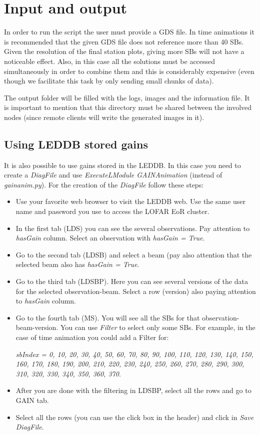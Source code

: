 \documentclass[a4paper,11pt]{article}
\begin{document}
\section {Input and output}

In order to run the script the user must provide a GDS file. In time animations it is recommended that the given GDS file does not reference more than 40 SBs. Given the resolution of the final station plots, giving more SBs will not have a noticeable effect. Also, in this case all the solutions must be accessed simultaneously in order to combine them and this is considerably expensive (even though we facilitate this task by only sending small chunks of data).

The output folder will be filled with the logs, images and the information file. It is important to mention that this directory must be shared between the involved nodes (since remote clients will write the generated images in it).

\subsection {Using LEDDB stored gains}

It is also possible to use gains stored in the LEDDB. In this case you need to create a \textit{DiagFile} and use \textit{ExecuteLModule GAINAnimation} (instead of \textit{gainanim.py}). For the creation of the \textit{DiagFile} follow these steps:

\begin{itemize}
\item Use your favorite web browser to visit the LEDDB web. Use the same user name and password you use to access the LOFAR EoR cluster.
\item In the first tab (LDS) you can see the several observations. Pay attention to \textit{hasGain} column. Select an observation with \textit{hasGain = True}.
\item Go to the second tab (LDSB) and select a beam (pay also attention that the selected beam also has \textit{hasGain = True}.
\item Go to the third tab (LDSBP). Here you can see several versions of the data for the selected observation-beam. Select a row (version) also paying attention to \textit{hasGain} column.
\item Go to the fourth tab (MS). You will see all the SBs for that observation-beam-version. You can use \textit{Filter} to select only some SBs. For example, in the case of time animation you could add a Filter for: 

 \textit{sbIndex = 0, 10, 20, 30, 40, 50, 60, 70, 80, 90, 100, 110, 120, 130, 140, 150, 160, 170, 180, 190, 200, 210, 220, 230, 240, 250, 260, 270, 280, 290, 300, 310, 320, 330, 340, 350, 360, 370}.
\item After you are done with the filtering in LDSBP, select all the rows and go to GAIN tab.
\item Select all the rows (you can use the click box in the header) and click in \textit{Save DiagFile}.
\end{itemize}
\end{document}
